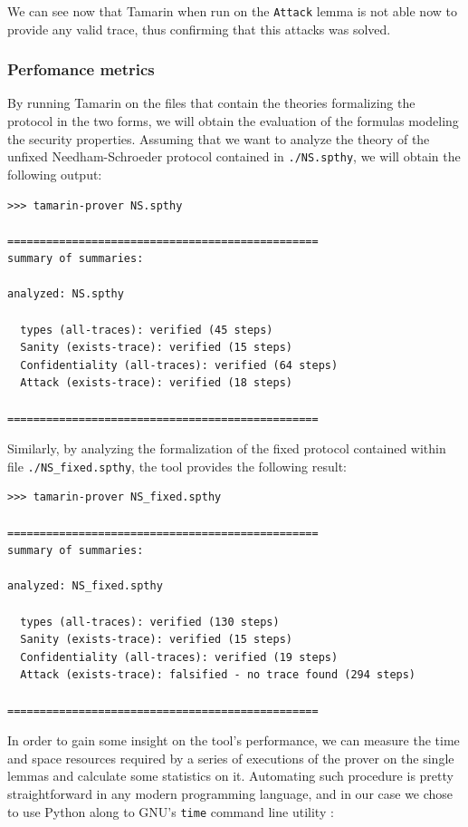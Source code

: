 \documentclass[fleqn,10pt]{SelfArx} %
\begin{document}
We can see now that Tamarin when run on the \lstinline|Attack| lemma is not able now to provide any valid trace, thus confirming that this attacks was solved.

\subsubsection{Perfomance metrics}

By running Tamarin on the files that contain the theories formalizing the protocol in the two forms, we will obtain the evaluation of the formulas modeling the security properties. Assuming that we want to analyze the theory of the unfixed Needham-Schroeder protocol contained in \lstinline|./NS.spthy|, we will obtain the following output:

\begin{lstlisting}[language=Terminal]
>>> tamarin-prover NS.spthy

================================================
summary of summaries:

analyzed: NS.spthy

  types (all-traces): verified (45 steps)
  Sanity (exists-trace): verified (15 steps)
  Confidentiality (all-traces): verified (64 steps)
  Attack (exists-trace): verified (18 steps)

================================================
\end{lstlisting}

Similarly, by analyzing the formalization of the fixed protocol contained within file \lstinline|./NS_fixed.spthy|, the tool provides the following result:

\begin{lstlisting}[language=Terminal]
>>> tamarin-prover NS_fixed.spthy

================================================
summary of summaries:

analyzed: NS_fixed.spthy

  types (all-traces): verified (130 steps)
  Sanity (exists-trace): verified (15 steps)
  Confidentiality (all-traces): verified (19 steps)
  Attack (exists-trace): falsified - no trace found (294 steps)

================================================
\end{lstlisting}

In order to gain some insight on the tool's performance, we can measure the time and space resources required by a series of executions of the prover on the single lemmas and calculate some statistics on it. Automating such procedure is pretty straightforward in any modern programming language, and in our case we chose to use Python along to GNU's \lstinline|time| command line utility \cite{GNUtime}:
\end{document}
